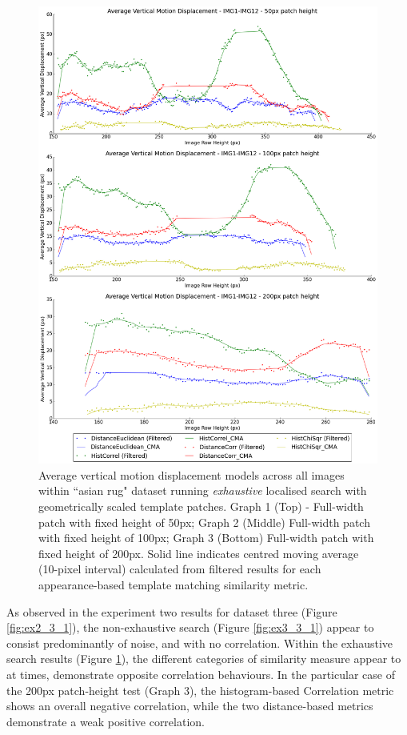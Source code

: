 \clearpage
\begin{figure}[ht!]
\centering
\includegraphics[scale=0.3]{images/results/wiltshire_inside_10cm_scaled_exhaustive}
\caption{Average vertical motion displacement models across all images within ``asian rug" dataset running \textit{exhaustive} localised search with geometrically scaled template patches. Graph 1 (Top) - Full-width patch with fixed height of 50px; Graph 2 (Middle) Full-width patch with fixed height of 100px; Graph 3 (Bottom) Full-width patch with fixed height of 200px. Solid line indicates centred moving average (10-pixel interval) calculated from filtered results for each appearance-based template matching similarity metric.}
\label{fig:ex3_3_2}
\end{figure}

As observed in the experiment two results for dataset three (Figure \ref{fig:ex2_3_1}), the non-exhaustive search (Figure \ref{fig:ex3_3_1}) appear to consist predominantly of noise, and with no correlation. Within the exhaustive search results (Figure \ref{fig:ex3_3_2}), the different categories of similarity measure appear to at times, demonstrate opposite correlation behaviours. In the particular case of the 200px patch-height test (Graph 3), the histogram-based Correlation metric shows an overall negative correlation, while the two distance-based metrics demonstrate a weak positive correlation.


